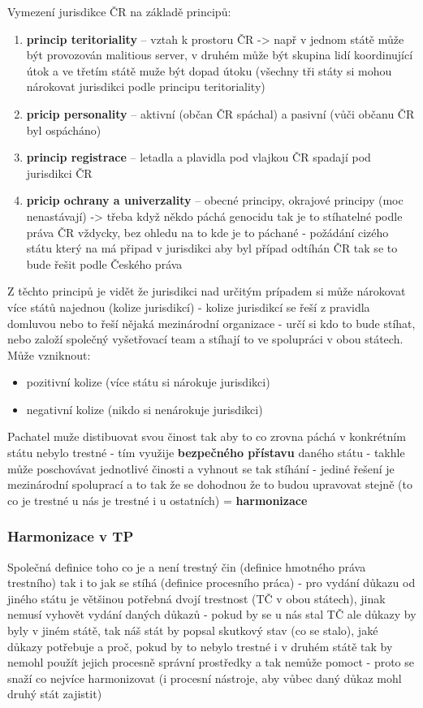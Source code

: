 Vymezení jurisdikce ČR na základě principů: 
\begin{enumerate}
    \item \textbf{princip teritoriality} -- vztah k prostoru ČR -> např v jednom státě může být provozován malitious server, v druhém může být skupina lidí koordinující útok a ve třetím státě muže být dopad útoku (všechny tři státy si mohou nárokovat jurisdikci podle principu teritoriality)
    \item \textbf{pricip personality} -- aktivní (občan ČR spáchal) a pasivní (vůči občanu ČR byl ospácháno)
    \item \textbf{princip registrace} -- letadla a plavidla pod vlajkou ČR spadají pod jurisdikci ČR
    \item \textbf{pricip ochrany a univerzality} -- obecné principy, okrajové principy (moc nenastávají) -> třeba když někdo páchá genocidu tak je to stíhatelné podle práva ČR vždycky, bez ohledu na to kde je to páchané - požádání cizého státu který na má připad v jurisdikci aby byl případ odtíhán ČR tak se to bude řešit podle Českého práva
\end{enumerate}

Z těchto principů je vidět že jurisdikci nad určitým prípadem si může nárokovat více států najednou (kolize jurisdikcí) - kolize jurisdikcí se řeší z pravidla domluvou nebo to řeší nějaká mezinárodní organizace - určí si kdo to bude stíhat, nebo založí společný vyšetřovací team a stíhají to ve spolupráci v obou státech. Může vzniknout:
\begin{itemize}
    \item pozitivní kolize (více státu si nárokuje jurisdikci)
    \item negativní kolize (nikdo si nenárokuje jurisdikci)
\end{itemize}
Pachatel muže distibuovat svou činost tak aby to co zrovna páchá v konkrétním státu nebylo trestné - tím využije \textbf{bezpečného přístavu} daného státu - takhle může poschovávat jednotlivé činosti a vyhnout se tak stíhání - jediné řešení je mezinárodní spoluprací a to tak že se dohodnou že to budou upravovat stejně (to co je trestné u nás je trestné i u ostatních) = \textbf{harmonizace}

\subsubsection{Harmonizace v TP}
Společná definice toho co je a není trestný čin (definice hmotného práva trestního) tak i to jak se stíhá (definice procesního práca) - pro vydání důkazu od jiného státu je většinou potřebná dvojí trestnost (TČ v obou státech), jinak nemusí vyhovět vydání daných důkazů - pokud by se u nás stal TČ ale důkazy by byly v jiném státě, tak náš stát by popsal skutkový stav (co se stalo), jaké důkazy potřebuje a proč, pokud by to nebylo trestné i v druhém státě tak by nemohl použít jejich procesně správní prostředky a tak nemůže pomoct - proto se snaží co nejvíce harmonizovat (i procesní nástroje, aby vůbec daný důkaz mohl druhý stát zajistit)


